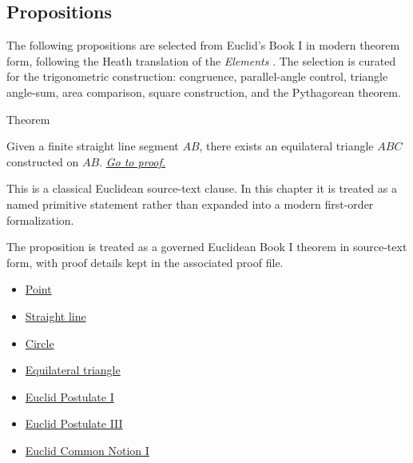 \subsection*{Propositions}

\begin{remark*}
The following propositions are selected from Euclid's Book I in modern theorem
form, following the Heath translation of the \textit{Elements}
\citep[Book I]{euclid-elements-heath}. The selection is curated for the
trigonometric construction: congruence, parallel-angle control, triangle
angle-sum, area comparison, square construction, and the Pythagorean theorem.
\end{remark*}


\begin{theorembox}{Theorem}
\begin{theorem}
\label{thm:euclid-i-1}
\label{prop:I.1}
Given a finite straight line segment $AB$, there exists an equilateral
triangle $ABC$ constructed on $AB$.
\hyperref[prf:euclid-i-1]{\textit{Go to proof.}}
\end{theorem}
\end{theorembox}

\begin{remark*}
This is a classical Euclidean source-text clause. In this chapter it is treated
as a named primitive statement rather than expanded into a modern first-order
formalization.
\end{remark*}

\begin{remark*}[Interpretation]
The proposition is treated as a governed Euclidean Book I theorem in source-text
form, with proof details kept in the associated proof file.
\end{remark*}
\begin{lra-not-visible}
\begin{dependencies}
\begin{itemize}
  \item \hyperref[def:euclid-point]{Point}
  \item \hyperref[def:euclid-straight-line]{Straight line}
  \item \hyperref[def:euclid-circle]{Circle}
  \item \hyperref[def:euclid-triangle-side-classes]{Equilateral triangle}
  \item \hyperref[ax:euclid-postulate-draw-straight-line]{Euclid Postulate I}
  \item \hyperref[ax:euclid-postulate-describe-circle]{Euclid Postulate III}
  \item \hyperref[ax:euclid-common-notion-things-equal-to-same]{Euclid Common Notion I}
\end{itemize}
\end{dependencies}
\end{lra-not-visible}

